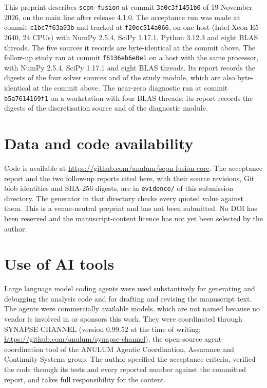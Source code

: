 \documentclass[11pt]{article}
\begin{document}
This preprint describes \texttt{scpn-fusion} at commit \texttt{3a0c3f1451b0}
of 19 November 2026, on the main line after release 4.1.0.  The acceptance
run was made at commit \texttt{c1bc7f63a93b} and tracked at
\texttt{f20ec514a066}, on one host (Intel Xeon E5-2640, 24 CPUs) with NumPy
2.5.4, SciPy 1.17.1, Python 3.12.3 and eight BLAS threads.  The five sources
it records are byte-identical at the commit above.  The follow-up study ran at
commit \texttt{f6136eb6e0e1} on a host with the same processor, with NumPy
2.5.4, SciPy 1.17.1 and eight BLAS threads.  Its report records the digests of
the four solver sources and of the study module, which are also
byte-identical at the commit above.  The near-zero diagnostic ran at commit
\texttt{b5a7614169f1} on a workstation with four BLAS threads; its report
records the digests of the discretisation source and of the diagnostic
module.

\section*{Data and code availability}

Code is available at \url{https://github.com/anulum/scpn-fusion-core}.  The
acceptance report and the two follow-up reports cited here, with their
source revisions, Git blob identities and SHA-256 digests, are in
\texttt{evidence/} of this submission directory.  The generator in that
directory checks every quoted value against them.  This is a
venue-neutral preprint and has not been submitted.  No DOI has been reserved
and the manuscript-content licence has not yet been selected by the author.

\section*{Use of AI tools}

Large language model coding agents were used substantively for generating and
debugging the analysis code and for drafting and revising the manuscript text.
The agents were commercially available models, which are not named because no
vendor is involved in or sponsors this work.  They were coordinated through
SYNAPSE CHANNEL (version 0.99.52 at the time of writing;
\url{https://github.com/anulum/synapse-channel}), the open-source
agent-coordination tool of the ANULUM Agentic Coordination, Assurance and
Continuity Systems group.  The author specified the acceptance criteria,
verified the code through its tests and every reported number against the
committed report, and takes full responsibility for the content.


\end{document}
